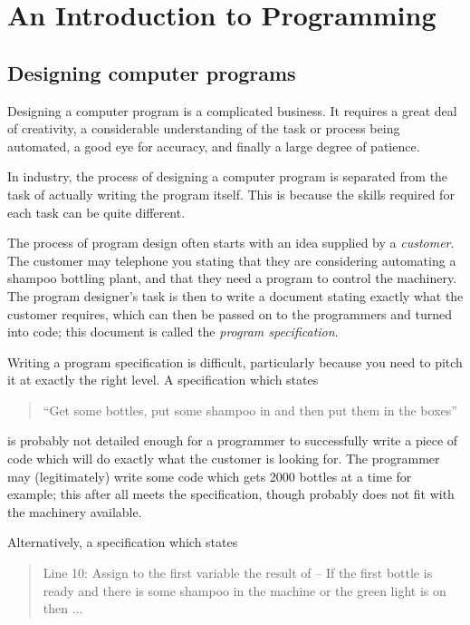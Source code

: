 
\newpage 
\section{An Introduction to Programming}

\subsection{Designing computer programs}

Designing a computer program is a complicated business. It requires a 
great deal of creativity, a considerable understanding of the task or process
being automated, a good eye for accuracy, and finally a large degree of 
patience. 

In industry, the process of designing a computer program is separated from
the task of actually writing the program itself. This is because the skills
required for each task can be quite different. 

The process of program design often starts with an idea supplied by a 
{\em customer}. The customer may telephone you stating that they are 
considering automating a shampoo bottling plant, and that they need a program
to control the machinery. The program designer's task is then to write 
a document stating exactly what the 
customer requires, which can then be passed on to the programmers
and turned into code; this document is called the {\em program specification}. 

Writing a program specification is difficult, particularly because you 
need to pitch it at exactly the right level. A specification which states 

\begin{quote}
``Get some bottles, put some shampoo in and then put them in the boxes''
\end{quote}

is probably not detailed enough for a programmer to successfully write a 
piece of code which will do exactly what the customer is looking for. The
programmer may (legitimately) write some code which gets 2000 bottles at a
time for example; this after all meets the specification, though probably does not 
fit with the machinery available. 

Alternatively, a specification which states

\begin{quote}
Line 10: Assign to the first variable the result of -- If the first bottle is
ready and there is some shampoo in the machine or the green light is on
then ...
\end{quote}

